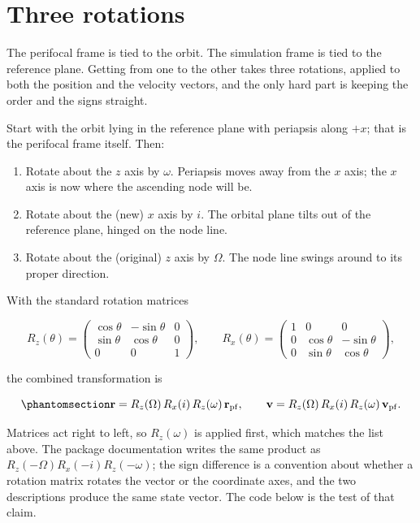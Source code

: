 \documentclass[
  10.5pt,
  letterpaper,
]{scrbook}
\providecommand{\tightlist}{%
  \setlength{\itemsep}{0pt}\setlength{\parskip}{0pt}}
\theoremstyle{definition}
\theoremstyle{plain}
\theoremstyle{remark}
\begin{document}
\section{Three rotations}\label{three-rotations}

The perifocal frame is tied to the orbit. The simulation frame is tied
to the reference plane. Getting from one to the other takes three
rotations, applied to both the position and the velocity vectors, and
the only hard part is keeping the order and the signs straight.

Start with the orbit lying in the reference plane with periapsis along
\(+x\); that is the perifocal frame itself. Then:

\begin{enumerate}
\def\labelenumi{\arabic{enumi}.}
\tightlist
\item
  Rotate about the \(z\) axis by \(\omega\). Periapsis moves away from
  the \(x\) axis; the \(x\) axis is now where the ascending node will
  be.
\item
  Rotate about the (new) \(x\) axis by \(i\). The orbital plane tilts
  out of the reference plane, hinged on the node line.
\item
  Rotate about the (original) \(z\) axis by \(\Omega\). The node line
  swings around to its proper direction.
\end{enumerate}

With the standard rotation matrices

\[
R_z(\theta) = \begin{pmatrix} \cos\theta & -\sin\theta & 0 \\ \sin\theta & \cos\theta & 0 \\ 0 & 0 & 1 \end{pmatrix}, \qquad
R_x(\theta) = \begin{pmatrix} 1 & 0 & 0 \\ 0 & \cos\theta & -\sin\theta \\ 0 & \sin\theta & \cos\theta \end{pmatrix},
\]

the combined transformation is

\begin{equation}\protect\phantomsection\label{eq-rotations}{
\mathbf{r} = R_z(\Omega)\,R_x(i)\,R_z(\omega)\,\mathbf{r}_{\mathrm{pf}}, \qquad
\mathbf{v} = R_z(\Omega)\,R_x(i)\,R_z(\omega)\,\mathbf{v}_{\mathrm{pf}}.
}\end{equation}

Matrices act right to left, so \(R_z(\omega)\) is applied first, which
matches the list above. The package documentation writes the same
product as \(R_z(-\Omega)R_x(-i)R_z(-\omega)\); the sign difference is a
convention about whether a rotation matrix rotates the vector or the
coordinate axes, and the two descriptions produce the same state vector.
The code below is the test of that claim.
\end{document}
